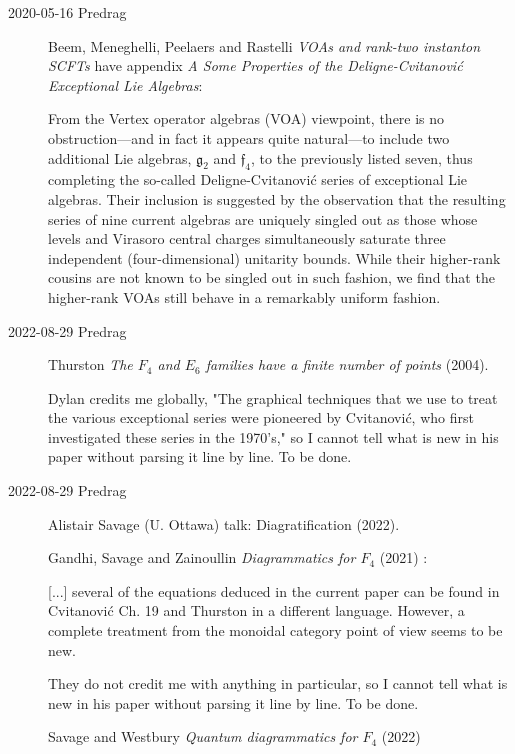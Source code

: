 \begin{description}
\item[2020-05-16 Predrag]
Beem, Meneghelli, Peelaers and Rastelli
{\em {VOAs} and rank-two instanton {SCFTs}}
have appendix {\em A Some Properties of the Deligne-Cvitanovi{\'c}
Exceptional Lie Algebras}:

From the Vertex operator algebras (VOA) viewpoint, there is no
obstruction---and in fact it appears quite natural---to include two
additional Lie algebras, $\mathfrak{g}_2$ and $\mathfrak{f}_4$, to the
previously listed seven, thus completing the so-called
Deligne-Cvitanovi{\'c} series of exceptional Lie algebras.
Their inclusion is suggested by the observation that the resulting series
of nine current algebras are uniquely singled out as those whose levels
and Virasoro central charges simultaneously saturate three independent
(four-dimensional) unitarity bounds. While their higher-rank cousins are
not known to be singled out in such fashion, we find that the higher-rank
VOAs still behave in a remarkably uniform fashion.

\item[2022-08-29 Predrag]
Thurston
{\em The {$F_4$} and {$E_6$} families have a finite number of points} (2004).

Dylan credits me globally,
"The graphical techniques that we use to treat the various exceptional
series were pioneered by Cvitanovi{\'c}, who first investigated these
series in the 1970's," so I cannot tell what is new in his paper
without parsing it line by line. To be done.

\item[2022-08-29 Predrag]
Alistair Savage (U. Ottawa) talk:
{Diagratification}  (2022).

Gandhi, Savage and Zainoullin
{\em Diagrammatics for {$F_4$}} (2021)
:

[...] several of the equations deduced in the current paper can be found
in Cvitanovi{\'c} Ch. 19 and Thurston in a
different language. However, a complete treatment from the monoidal
category point of view seems to be
new.

They do not credit me with anything in particular,  so I cannot tell what
is new in his paper without parsing it line by line. To be done.

Savage and Westbury
{\em Quantum diagrammatics for {$F_4$}}  (2022)


\end{description}
